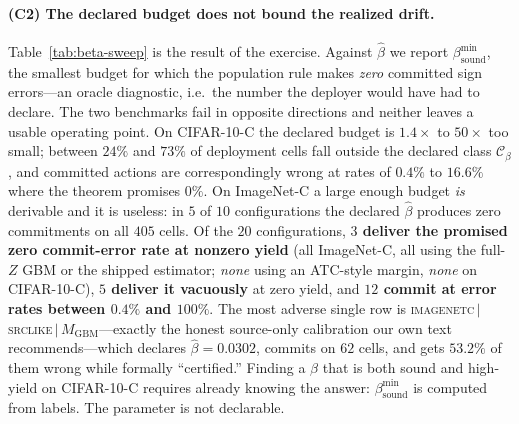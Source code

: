 \paragraph{(C2) The declared budget does not bound the realized drift.} Table~\ref{tab:beta-sweep}
is the result of the exercise. Against $\widehat\beta$ we report $\beta^{\min}_{\mathrm{sound}}$,
the smallest budget for which the population rule makes \emph{zero} committed sign errors---an
oracle diagnostic, i.e.\ the number the deployer would have had to declare. The two benchmarks fail
in opposite directions and neither leaves a usable operating point.
On CIFAR-10-C the declared budget is $1.4\times$ to $50\times$ too small; between $24\%$ and $73\%$
of deployment cells fall outside the declared class $\mathcal C_\beta$, and committed actions are
correspondingly wrong at rates of $0.4\%$ to $16.6\%$ where the theorem promises $0\%$.
On ImageNet-C a large enough budget \emph{is} derivable and it is useless: in $5$ of $10$
configurations the declared $\widehat\beta$ produces zero commitments on all $405$ cells.
Of the $20$ configurations, \textbf{$3$ deliver the promised zero commit-error rate at nonzero
yield} (all ImageNet-C, all using the full-$Z$ GBM or the shipped estimator; \emph{none} using an
ATC-style margin, \emph{none} on CIFAR-10-C), \textbf{$5$ deliver it vacuously} at zero yield, and
\textbf{$12$ commit at error rates between $0.4\%$ and $100\%$}. The most adverse single row is
\textsc{imagenetc}\,$|$\,\textsc{srclike}\,$|$\,$M_{\mathrm{GBM}}$---exactly the honest source-only
calibration our own text recommends---which declares $\widehat\beta=0.0302$, commits on $62$ cells,
and gets $53.2\%$ of them wrong while formally ``certified.'' Finding a $\beta$ that is both sound
and high-yield on CIFAR-10-C requires already knowing the answer: $\beta^{\min}_{\mathrm{sound}}$ is
computed from labels. The parameter is not declarable.

